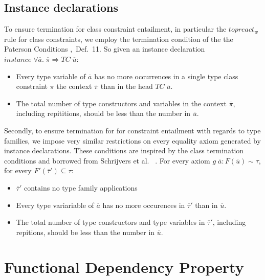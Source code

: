 \subsection{Instance declarations}
To ensure termination for class constraint entailment, in particular the
$topreact_w$ rule for class constraints, we employ the termination condition of
the the Paterson Conditions \cite{fundeps-chrs},~Def.~11. So given an instance
declaration $instance \; \forall \overline{a}. \; \overline{\pi} \Rightarrow TC
\; \overline{u}$:

\begin{itemize}
    \item Every type variable of $\overline{a}$ has no more occurrences in a
    single type class constraint $\pi$ the context $\overline{\pi}$ than in the
    head $TC \; \overline{u}$.

    \item The total number of type constructors and variables in the context
    $\overline{\pi}$, including repititions, should be less than the number in
    $\overline{u}$.
\end{itemize}

Secondly, to ensure termination for for constraint entailment with regards to
type families, we impose very similar restrictions on every equality axiom
generated by instance declarations. These conditions are inspired by the class
termination conditions and borrowed from Schrijvers et
al.~\cite{type-checking-with-open-type-functions} .
For every axiom $g \; \overline{a} : F(\overline{u}) \sim \tau$, for every
$F'(\overline{\tau}') \subseteq \tau$:
\begin{itemize}
    \item $\overline{\tau}'$ contains no type family applications

    \item Every type variariable of $\overline{a}$ has no more occurences in
    $\overline{\tau}'$ than in $\overline{u}$.

    \item The total number of type constructors and type variables in
    $\overline{\tau}'$, including repitions, should be less than the number in
    $\overline{u}$.
\end{itemize}

\section{Functional Dependency Property}

